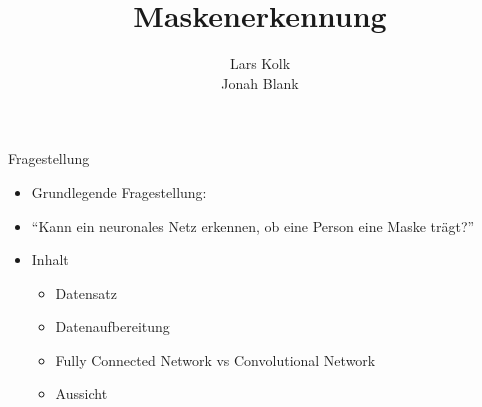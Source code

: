 \documentclass[aspectratio=1610, 9pt]{beamer}
\title{Maskenerkennung}
\author[L.~Kolk,~J.~Blank]{Lars Kolk\\ Jonah Blank}
\institute[ML-Seminar]{\\[0.3cm]TU Dortmund \\ \Large ML-Seminar}
\begin{document}
\maketitle


\begin{frame}{Fragestellung}
\begin{itemize}
  \item Grundlegende Fragestellung:
  \item ``Kann ein neuronales Netz erkennen, ob eine Person eine Maske trägt?''
  \vspace{0.5cm}
  \item Inhalt
  \begin{itemize}
    \item Datensatz
    \item Datenaufbereitung
    \item Fully Connected Network vs Convolutional Network
    \item Aussicht
\end{itemize}
\end{itemize}
\end{frame}
\end{document}

